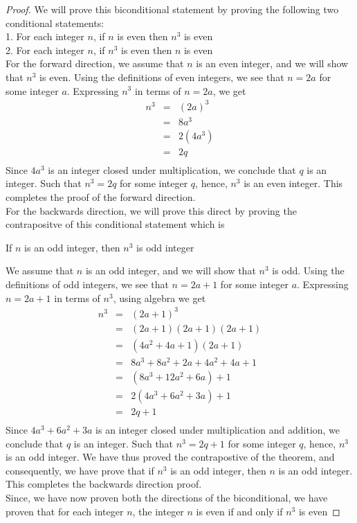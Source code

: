 \begin{proof}
We will prove this biconditional statement by proving the following two conditional statements: \\
1. For each integer $n$, if $n$ is even then $n^3$ is even \\
2. For each integer $n$, if $n^3$ is even then $n$ is even \\

For the forward direction, we assume that $n$ is an even integer, and we will show that $n^3$ is even. Using the definitions of even integers, we see that $n = 2a$ for some integer $a$. Expressing $n^3$ in terms of $n = 2a$, we get
	\begin{eqnarray*}
		n^3 & = & (2a)^3  \nonumber \\
		& = & 8a^3  \nonumber \\
		& = & 2(4a^3)  \nonumber \\
		& = & 2q \nonumber \\
	\end{eqnarray*}
Since $4a^3$ is an integer closed under multiplication, we conclude that $q$ is an integer. Such that $n^3 = 2q$ for some integer $q$, hence, $n^3$ is an even integer. This completes the proof of the forward direction. \\
For the backwards direction, we will prove this direct by proving the contrapositve of this conditional statement which is
	\begin{center}
		If $n$ is an odd integer, then $n^3$ is odd integer
	\end{center}

We assume that $n$ is an odd integer, and we will show that $n^3$ is odd. Using the definitions of odd integers, we see that $n = 2a + 1$ for some integer $a$. Expressing $n = 2a + 1$ in terms of $n^3$, using algebra we get
	\begin{eqnarray*}
		n^3 & = & (2a + 1)^3  \nonumber \\
		& = & (2a + 1)(2a + 1)(2a + 1) \nonumber \\
		& = & (4a^2 + 4a + 1)(2a + 1) \nonumber \\		
		& = & 8a^3 + 8a^2 + 2a + 4a^2 + 4a + 1 \nonumber \\			
		& = & (8a^3 + 12a^2 + 6a) + 1 \nonumber \\
		& = & 2(4a^3 + 6a^2 + 3a) + 1 \nonumber \\
		& = & 2q + 1 \nonumber \\
	\end{eqnarray*}
Since $4a^3 + 6a^2 + 3a$ is an integer closed under multiplication and addition, we conclude that $q$ is an integer. Such that $n^3 = 2q + 1$ for some integer $q$, hence, $n^3$ is an odd integer. We have thus proved the contrapostive of the theorem, and consequently, we have prove that if $n^3$ is an odd integer, then $n$ is an odd integer. This completes the backwards direction  proof. \\
Since, we have now proven both the directions of the biconditional, we have proven that for each integer $n$, the integer $n$ is even if and only if $n^3$ is even
\end{proof}



